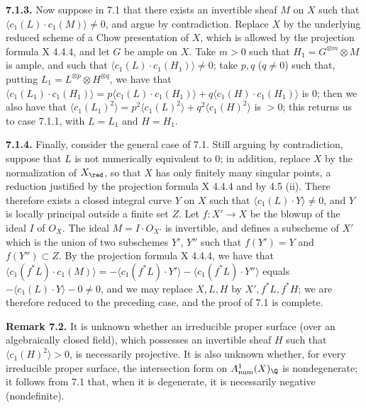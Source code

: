 \textbf{7.1.3.} Now suppose in 7.1 that there exists an invertible sheaf $M$ on $X$ such that $\langle c_1(L)\cdot c_1(M)\rangle\ne0$, and argue by contradiction. Replace $X$ by the underlying reduced scheme of a Chow presentation of $X$, which is allowed by the projection formula X 4.4.4, and let $G$ be ample on $X$. Take $m>0$ such that $H_1=G^{\otimes m}\otimes M$ is ample, and such that $\langle c_1(L)\cdot c_1(H_1)\rangle\ne0$; take $p,q$ ($q\ne0$) such that, putting $L_1=L^{\otimes p}\otimes H^{\otimes q}$, we have that $\langle c_1(L_1)\cdot c_1(H_1)\rangle=p\langle c_1(L)\cdot c_1(H_1)\rangle+q\langle c_1(H)\cdot c_1(H_1)\rangle$ is $0$; then we also have that $\langle c_1(L_1)^2\rangle=p^2\langle c_1(L)^2\rangle+q^2\langle c_1(H)^2\rangle$ is $>0$; this returns us to case 7.1.1, with $L=L_1$ and $H=H_1$.

\textbf{7.1.4.} Finally, consider the general case of 7.1. Still arguing by contradiction, suppose that $L$ is not numerically equivalent to $0$; in addition, replace $X$ by the normalization of $X_{\red}$, so that $X$ has
%
only finitely many singular points, a reduction justified by the projection formula X 4.4.4 and by 4.5 (ii). There therefore exists a closed integral curve $Y$ on $X$ such that $\langle c_1(L)\cdot Y\rangle\ne0$, and $Y$ is locally principal outside a finite set $Z$. Let $f:X'\to X$ be the blowup of the ideal $I$ of ${O}_X$. The ideal $M=I\cdot{O}_{X'}$ is invertible, and defines a subscheme of $X'$ which is the union of two subschemes $Y'$, $Y''$ such that $f(Y')=Y$ and $f(Y'')\subset Z$. By the projection formula X 4.4.4, we have that $\langle c_1(f^*L)\cdot c_1(M)\rangle=-\langle c_1(f^*L)\cdot Y'\rangle-\langle c_1(f^*L)\cdot Y''\rangle$ equals $-\langle c_1(L)\cdot Y\rangle-0\ne0$, and we may replace $X,L,H$ by $X',f^*L,f^*H$; we are therefore reduced to the preceding case, and the proof of 7.1 is complete.

\textbf{Remark 7.2.} It is unknown whether an irreducible proper surface (over an algebraically closed field), which possesses an invertible sheaf $H$ such that $\langle c_1(H)^2\rangle>0$, is necessarily projective. It is also unknown whether, for every irreducible proper surface, the intersection form on $A^1_{\mathrm{num}}(X)_{\Q}$ is nondegenerate; it follows from 7.1 that, when it is degenerate, it is necessarily negative (nondefinite).

